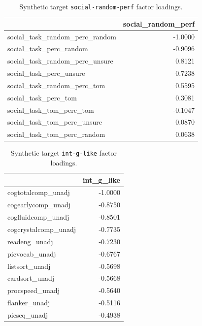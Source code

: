 \documentclass{article}
\begin{document}
\begin{table}[H]
\centering
\begin{tabular}{lr}
\toprule
 & social\_random\_perf \\
\midrule
social\_task\_random\_perc\_random & -1.0000 \\
social\_task\_perc\_random & -0.9096 \\
social\_task\_random\_perc\_unsure & 0.8121 \\
social\_task\_perc\_unsure & 0.7238 \\
social\_task\_random\_perc\_tom & 0.5595 \\
social\_task\_perc\_tom & 0.3081 \\
social\_task\_tom\_perc\_tom & -0.1047 \\
social\_task\_tom\_perc\_unsure & 0.0870 \\
social\_task\_tom\_perc\_random & 0.0638 \\
\bottomrule
\end{tabular}

\footnotesize
\caption{Synthetic target \texttt{social-random-perf} factor loadings.}
\normalsize
\label{tab:social-random-perf}
\end{table}


\begin{table}[H]
\centering
\begin{tabular}{lr}
\toprule
 & int\_g\_like \\
\midrule
cogtotalcomp\_unadj & -1.0000 \\
cogearlycomp\_unadj & -0.8750 \\
cogfluidcomp\_unadj & -0.8501 \\
cogcrystalcomp\_unadj & -0.7735 \\
readeng\_unadj & -0.7230 \\
picvocab\_unadj & -0.6767 \\
listsort\_unadj & -0.5698 \\
cardsort\_unadj & -0.5668 \\
procspeed\_unadj & -0.5640 \\
flanker\_unadj & -0.5116 \\
picseq\_unadj & -0.4938 \\
\bottomrule
\end{tabular}

\footnotesize
\caption{Synthetic target \texttt{int-g-like} factor loadings.}
\normalsize
\label{tab:int-g-like}
\end{table}
\end{document}
